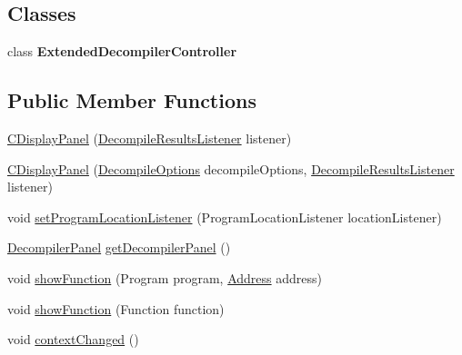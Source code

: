\subsection*{Classes}
\begin{DoxyCompactItemize}
\item 
class {\bfseries Extended\+Decompiler\+Controller}
\end{DoxyCompactItemize}
\subsection*{Public Member Functions}
\begin{DoxyCompactItemize}
\item 
\mbox{\hyperlink{classghidra_1_1app_1_1decompiler_1_1component_1_1_c_display_panel_ae22e9c816d32f4fb8ee7d6313bc07cbc}{C\+Display\+Panel}} (\mbox{\hyperlink{interfaceghidra_1_1app_1_1decompiler_1_1component_1_1_decompile_results_listener}{Decompile\+Results\+Listener}} listener)
\item 
\mbox{\hyperlink{classghidra_1_1app_1_1decompiler_1_1component_1_1_c_display_panel_a93da5ff4168353896ce34cf521dcaa8a}{C\+Display\+Panel}} (\mbox{\hyperlink{classghidra_1_1app_1_1decompiler_1_1_decompile_options}{Decompile\+Options}} decompile\+Options, \mbox{\hyperlink{interfaceghidra_1_1app_1_1decompiler_1_1component_1_1_decompile_results_listener}{Decompile\+Results\+Listener}} listener)
\item 
void \mbox{\hyperlink{classghidra_1_1app_1_1decompiler_1_1component_1_1_c_display_panel_ace727d9df1d16bcf1514aee81db6b007}{set\+Program\+Location\+Listener}} (Program\+Location\+Listener location\+Listener)
\item 
\mbox{\hyperlink{classghidra_1_1app_1_1decompiler_1_1component_1_1_decompiler_panel}{Decompiler\+Panel}} \mbox{\hyperlink{classghidra_1_1app_1_1decompiler_1_1component_1_1_c_display_panel_aa3f83a21fba71bc8d3d6acfb8efb3882}{get\+Decompiler\+Panel}} ()
\item 
void \mbox{\hyperlink{classghidra_1_1app_1_1decompiler_1_1component_1_1_c_display_panel_ad26f7df44bd4a50e2d6fe3c3251e667f}{show\+Function}} (Program program, \mbox{\hyperlink{class_address}{Address}} address)
\item 
void \mbox{\hyperlink{classghidra_1_1app_1_1decompiler_1_1component_1_1_c_display_panel_a62c4b0dc99331e02765f481131db23b2}{show\+Function}} (Function function)
\item 
void \mbox{\hyperlink{classghidra_1_1app_1_1decompiler_1_1component_1_1_c_display_panel_ae71133a49eecc3ace39aa4d2eb671c4b}{context\+Changed}} ()

\end{DoxyCompactItemize}
